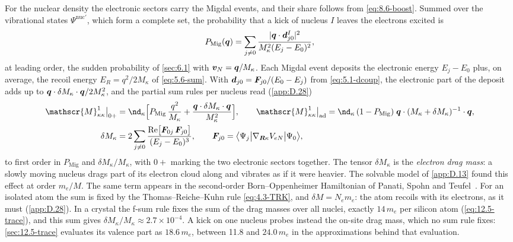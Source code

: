 For the nuclear density the electronic sectors carry the Migdal events, and their share follows from \cref{eq:8.6-boost}. Summed over the vibrational states $\Psi^{\mathrm{nuc}\prime}$, which form a complete set, the probability that a kick of nucleus $I$ leaves the electrons excited is
\begin{equation}
  P_{\mathrm{Mig}}(\bm{q}) = \sum_{j\neq0}\frac{|\bm{q}\cdot\bm{d}^I_{j0}|^2}{M_\kappa^2(E_j - E_0)^2} ,
  \label{eq:8.6-PMig}
\end{equation}
at leading order, the sudden probability of \cref{sec:6.1} with $\bm{v}_N = \bm{q}/M_\kappa$. Each Migdal event deposits the electronic energy $E_j - E_0$ plus, on average, the recoil energy $E_R = q^2/2M_\kappa$ of \cref{eq:5.6-sum}. With $\bm{d}_{j0} = \bm{F}_{j0}/(E_0 - E_j)$ from \cref{eq:5.1-dcoup}, the electronic part of the deposit adds up to $\bm{q}\cdot\delta M_\kappa\cdot\bm{q}/2M_\kappa^2$, and the partial sum rules per nucleus read (\cref{app:D.28})
\begin{equation}
  \begin{aligned}
  \mathscr{M}^1_{\kappa\kappa}\big|_{0+} &= \nd_\kappa\Bigl[P_{\mathrm{Mig}}\,\frac{q^2}{M_\kappa} + \frac{\vect{q}\cdot\delta M_\kappa\cdot\vect{q}}{M_\kappa^2}\Bigr] , \qquad
  \mathscr{M}^1_{\kappa\kappa}\big|_{\mathrm{ad}} = \nd_\kappa\,(1 - P_{\mathrm{Mig}})\;\vect{q}\cdot(M_\kappa + \delta M_\kappa)^{-1}\cdot\vect{q} , \\
  \delta M_\kappa &= 2\sum_{j\neq0}\frac{\Real\bigl[\vect{F}_{0j}\,\vect{F}_{j0}\bigr]}{(E_j - E_0)^3} , \qquad \vect{F}_{j0} = \bigl\langle\Psi_j\big|\nabla_{\vect{R}\kappa}V_{eN}\big|\Psi_0\bigr\rangle ,
  \end{aligned}
  \label{eq:8.6-fsum-k}
\end{equation}
to first order in $P_{\mathrm{Mig}}$ and $\delta M_\kappa/M_\kappa$, with $0+$ marking the two electronic sectors together. The tensor $\delta M_\kappa$ is the \emph{electron drag mass}: a slowly moving nucleus drags part of its electron cloud along and vibrates as if it were heavier. The solvable model of \cref{app:D.13} found this effect at order $m_e/M$. The same term appears in the second-order Born--Oppenheimer Hamiltonian of Panati, Spohn and Teufel~\cite[Eq.~(40), last term]{panati2003space}. For an isolated atom the sum is fixed by the Thomas--Reiche--Kuhn rule \cref{eq:4.3-TRK}, and $\delta M = N_em_e$: the atom recoils with its electrons, as it must (\cref{app:D.28}). In a crystal the f-sum rule fixes the sum of the drag masses over all nuclei, exactly $14\,m_e$ per silicon atom (\cref{eq:12.5-trace}), and this sum gives $\delta M_\kappa/M_\kappa \approx 2.7\times10^{-4}$. A kick on one nucleus probes instead the on-site drag mass, which no sum rule fixes: \cref{sec:12.5-trace} evaluates its valence part as $18.6\,m_e$, between 11.8 and $24.0\,m_e$ in the approximations behind that evaluation.

